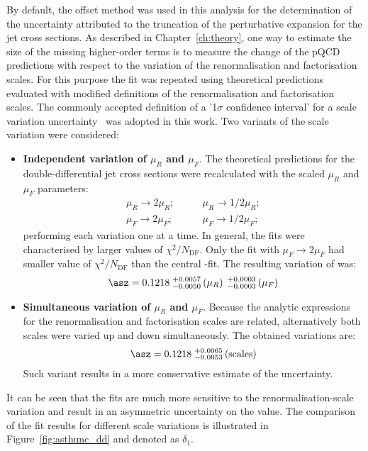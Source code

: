 By default, the offset method was used in this analysis for the determination of the uncertainty attributed to the truncation of the perturbative expansion for the jet cross sections. As described in Chapter~\ref{ch:theory}, one way to estimate 
the size of the missing higher-order terms is to measure the change of the pQCD predictions with respect to the variation of the renormalisation and factorisation scales. For this purpose the \asz fit was repeated using theoretical predictions evaluated with modified definitions of the renormalisation and factorisation scales. The commonly accepted definition of a '1$\sigma$ confidence interval' for a scale variation uncertainty~\cite{soper:1997} was adopted in this work. Two variants of the scale variation were considered:
\begin{itemize}
 \item \textbf{Independent variation of $\mu_R$ and $\mu_F$}. The theoretical predictions for the double-differential jet cross sections were recalculated with the scaled $\mu_R$ and $\mu_F$ parameters:
\begin{align}
 \mu_R \rightarrow 2\mu_R;&\qquad \mu_R \rightarrow 1/2\mu_R;\\
 \mu_F \rightarrow 2\mu_F;&\qquad \mu_F \rightarrow 1/2\mu_F;
\end{align}
performing each variation one at a time. In general, the fits were characterised by larger values of $\chi^2/N_\text{DF}$. Only the fit with $\mu_F \rightarrow 2\mu_F$ had smaller value of $\chi^2/N_\text{DF}$ than the central \asz-fit. The resulting variation of \asz was:
\begin{equation}
 \asz = 0.1218\;^{+0.0057}_{-0.0050}\left(\mu_R\right)\;^{+0.0003}_{-0.0003}\left(\mu_F\right)
\end{equation}
\item \textbf{Simultaneous variation of $\mu_R$ and $\mu_F$}. Because the analytic expressions for the renormalisation and factorisation scales are related, alternatively both scales were varied up and down simultaneously. The obtained variations are:
\begin{equation}
 \asz = 0.1218\;^{+0.0065}_{-0.0053}\left(\text{scales}\right)
\end{equation}
Such variant results in a more conservative estimate of the uncertainty. 
\end{itemize}
It can be seen that the fits are much more sensitive to the renormalisation-scale variation and result in an asymmetric uncertainty on the \asz value. The comparison of the fit results for different scale variations is illustrated in Figure~\ref{fig:asthunc_dd} and denoted as $\delta_1$.

